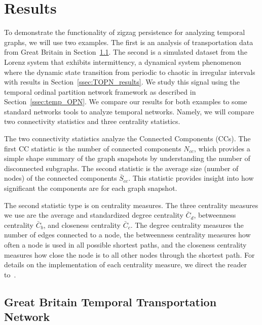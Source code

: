 %
%
%
%

\section{Results}
\label{sec:results}
To demonstrate the functionality of zigzag persistence for analyzing temporal graphs, we will use two examples. 
The first is an analysis of transportation data from Great Britain in Section~\ref{ssec:GB_results}. 
The second is a simulated dataset from the Lorenz system that exhibits intermittency, a dynamical system phenomenon where the dynamic state transition from periodic to chaotic in irregular intervals with results in Section~\ref{ssec:TOPN_results}. 
We study this signal using the temporal ordinal partition network framework as described in Section~\ref{ssec:temp_OPN}.
We compare our results for both examples to some standard networks tools to analyze temporal networks. Namely, we will compare two connectivity statistics and three centrality statistics. 

The two connectivity statistics analyze the Connected Components (CCs). The first CC statistic is the number of connected components $N_{cc}$, which provides a simple shape summary of the graph snapshots by understanding the number of disconnected subgraphs. The second statistic is the average size (number of nodes) of the connected components $\bar{S}_{cc}$. This statistic provides insight into how significant the components are for each graph snapshot.

The second statistic type is on centrality measures. The three centrality measures we use are the average and standardized degree centrality $\bar{C}_d$, betweenness centrality $\bar{C}_b$, and closeness centrality $\bar{C}_c$. 
The degree centrality measures the number of edges connected to a node, the betweenness centrality measures how often a node is used in all possible shortest paths, and the closeness centrality measures how close the node is to all other nodes through the shortest path.
For details on the implementation of each centrality measure, we direct the reader to~\cite{Landherr2010}.




\subsection{Great Britain Temporal Transportation Network} \label{ssec:GB_results}

